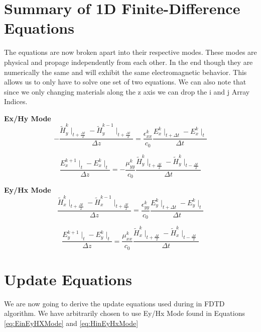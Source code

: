 \documentclass[a4paper,10pt]{article}
\begin{document}
\section{Summary of 1D Finite-Difference Equations}

The equations are now broken apart into their respective modes.  These modes are physical and propage independently from each other.  In the end though they are numerically the same and will exhibit the same electromagnetic behavior.   This allows us to only have to solve one set of two equations.  We can also note that since we only changing materials along the z axis we can drop the i and j Array Indices.



\textbf{Ex/Hy Mode}
\begin{equation}
  - \frac{\tilde{H}_{y}^{k}\mid_{t+\frac  {\Delta t}{2}} - \tilde{H}_{y}^{k-1}\mid_{t+\frac  {\Delta t}{2}}}{\Delta z} = \frac{\epsilon_{xx}^{k}}{c_0} \frac{E_{x}^{k}\mid_{t+\Delta t} - E_{x}^{k}\mid_{t}}{\Delta t}
\end{equation}

\begin{equation}
  \frac{E_{x}^{k+1}\mid_{t} - E_{x}^{k}\mid_{t}}{\Delta z} = -\frac{\mu_{yy}^{k}}{c_0} \frac{\tilde{H}_{y}^{k}\mid_{t+\frac  {\Delta t}{2}} - \tilde{H}_{y}^{k}\mid_{t-\frac{\Delta t}{2}}}{\Delta t}
\end{equation}



\textbf{Ey/Hx Mode}
\begin{equation}
  \label{eq:EinEyHXMode}
  \frac{\tilde{H}_{x}^{k}\mid_{t+\frac{\Delta t}{2}} - \tilde{H}_{x}^{k-1}\mid_{t+\frac  {\Delta t}{2}}}{\Delta z} = \frac{\epsilon_{yy}^{k}}{c_0} \frac{E_{y}^{k}\mid_{t+\Delta t} - E_{y}^{k}\mid_{t}}{\Delta t}
\end{equation}

\begin{equation}
  \label{eq:HinEyHxMode}
  \frac{E_{y}^{k+1}\mid_{t} - E_{y}^{k}\mid_{t}}{\Delta z} = \frac{\mu_{xx}^{k}}{c_0} \frac{\tilde{H}_{x}^{k}\mid_{t+\frac  {\Delta t}{2}} - \tilde{H}_{x}^{k}\mid_{t-\frac{\Delta t}{2}}}{\Delta t}
\end{equation}


\section{Update Equations}
We are now going to derive the update equations used during in FDTD algorithm.  We have arbitrarily chosen to use Ey/Hx Mode found in Equations \eqref{eq:EinEyHXMode} and \eqref{eq:HinEyHxMode}
\end{document}
